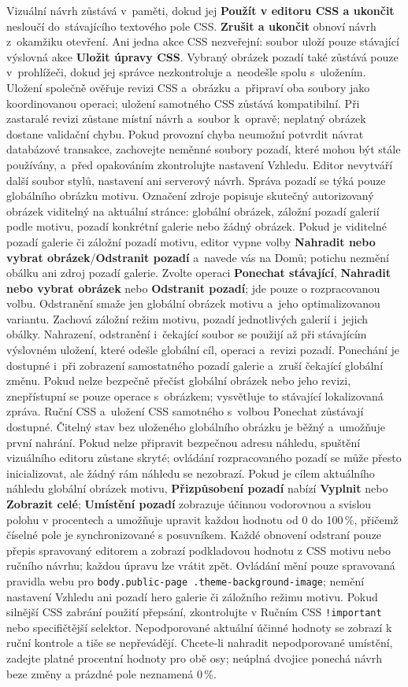 \documentclass[11pt,a4paper]{article}
\newcommand{\ui}[1]{\textbf{#1}}
\newcommand{\codeword}[1]{\nolinkurl{#1}}
\begin{document}
Vizuální návrh zůstává v~paměti, dokud jej \ui{Použít v editoru CSS a ukončit}
nesloučí do~stávajícího textového pole CSS. \ui{Zrušit a ukončit} obnoví návrh
z~okamžiku otevření. Ani jedna akce CSS nezveřejní: soubor uloží pouze stávající
výslovná akce \ui{Uložit úpravy CSS}. Vybraný obrázek pozadí také zůstává pouze
v~prohlížeči, dokud jej správce nezkontroluje a~neodešle spolu s~uložením.
Uložení společně ověřuje revizi CSS a~obrázku a~připraví oba soubory jako
koordinovanou operaci; uložení samotného CSS zůstává kompatibilní. Při zastaralé
revizi zůstane místní návrh a~soubor k~opravě; neplatný obrázek dostane
validační chybu. Pokud provozní chyba neumožní potvrdit návrat databázové
transakce, zachovejte neměnné soubory pozadí, které mohou být stále používány,
a~před opakováním zkontrolujte nastavení Vzhledu. Editor nevytváří další soubor
stylů, nastavení ani serverový návrh.
Správa pozadí se týká pouze globálního obrázku motivu. Označení zdroje popisuje
skutečný autorizovaný obrázek viditelný na aktuální stránce: globální obrázek,
záložní pozadí galerií podle motivu, pozadí konkrétní galerie nebo žádný
obrázek. Pokud je viditelné pozadí galerie či záložní pozadí motivu, editor
vypne volby \ui{Nahradit nebo vybrat obrázek}/\ui{Odstranit pozadí} a~navede vás
na Domů; potichu nezmění obálku ani zdroj pozadí galerie. Zvolte operaci
\ui{Ponechat stávající}, \ui{Nahradit nebo vybrat obrázek} nebo \ui{Odstranit
pozadí}; jde pouze o rozpracovanou volbu. Odstranění smaže jen globální obrázek
motivu a~jeho optimalizovanou variantu. Zachová záložní režim motivu, pozadí
jednotlivých galerií i~jejich obálky. Nahrazení, odstranění i~čekající soubor se
použijí až při stávajícím výslovném uložení, které odešle globální cíl, operaci
a~revizi pozadí. Ponechání je dostupné i~při zobrazení samostatného pozadí
galerie a~zruší čekající globální změnu.
Pokud nelze bezpečně přečíst globální obrázek nebo jeho revizi, znepřístupní se
pouze operace s~obrázkem; vysvětluje to stávající lokalizovaná zpráva. Ruční CSS
a~uložení CSS samotného s~volbou Ponechat zůstávají dostupné. Čitelný stav bez
uloženého globálního obrázku je běžný a~umožňuje první nahrání. Pokud nelze
připravit bezpečnou adresu náhledu, spuštění vizuálního editoru zůstane skryté;
ovládání rozpracovaného pozadí se může přesto inicializovat, ale žádný rám
náhledu se nezobrazí.
Pokud je cílem aktuálního náhledu globální obrázek motivu, \ui{Přizpůsobení
pozadí} nabízí \ui{Vyplnit} nebo \ui{Zobrazit celé}; \ui{Umístění pozadí}
zobrazuje účinnou vodorovnou a svislou polohu v procentech a umožňuje upravit
každou hodnotu od 0 do 100\,\%, přičemž číselné pole je synchronizované s
posuvníkem. Každé obnovení odstraní pouze přepis spravovaný editorem a zobrazí
podkladovou hodnotu z CSS motivu nebo ručního návrhu; každou úpravu lze vrátit
zpět. Ovládání mění pouze spravovaná pravidla webu pro
\codeword{body.public-page .theme-background-image}; nemění nastavení Vzhledu
ani pozadí hero galerie či záložního režimu motivu. Pokud silnější CSS zabrání
použití přepsání, zkontrolujte v Ručním CSS \codeword{!important} nebo
specifičtější selektor. Nepodporované aktuální účinné hodnoty se zobrazí k ruční
kontrole a tiše se nepřevádějí. Chcete-li nahradit nepodporované umístění,
zadejte platné procentní hodnoty pro obě osy; neúplná dvojice ponechá návrh beze
změny a prázdné pole neznamená 0\,\%.
\end{document}
